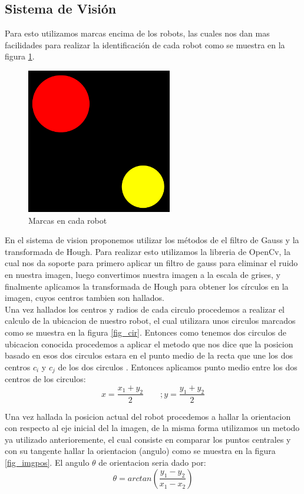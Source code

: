 \documentclass[conference]{IEEEtran}
\begin{document}
\subsection{Sistema de Visi\'on}
Para esto utilizamos marcas encima de los robots, las cuales nos dan mas facilidades para realizar la identificaci\'on de cada robot como se muestra en la figura \ref{fig_marrob}.
	\begin{figure}
	\centering
	\includegraphics[width=2.5in]{imagen1.pdf}
	
	\caption{Marcas en cada robot}
	\label{fig_marrob}
\end{figure}
En el sistema de vision proponemos utilizar los m\'etodos de el filtro de Gauss y la transformada de Hough. Para realizar esto utilizamos la libreria de OpenCv, la cual nos da soporte para primero aplicar un filtro de gauss para eliminar el ruido en nuestra imagen, luego convertimos nuestra imagen a la escala de grises, y finalmente aplicamos la transformada de Hough para obtener los c\'irculos en la imagen, cuyos centros tambien son hallados.\\
Una vez hallados los centros y radios de cada circulo procedemos a realizar el calculo de la ubicacion de nuestro robot, el cual utilizara unos circulos marcados como se muestra en la figura  \ref{fig_cir}. Entonces como tenemos dos circulos de ubicacion conocida procedemos a aplicar el metodo  que nos dice que la posicion basado en esos dos circulos estara en el punto medio de la recta que une los dos centros  $c_i$ y $c_j$ de los dos circulos \cite{kelson_glo}. Entonces aplicamos punto medio entre los dos centros de los circulos:
\begin{equation}
x=\frac{x_1+y_2}{2} \qquad; y=\frac{y_1+y_2}{{2}}
\end{equation}

Una vez hallada la posicion actual del robot procedemos a hallar la orientacion con respecto al eje inicial del la imagen, de la misma forma utilizamos un metodo ya utilizado anterioremente,  el cual consiste en comparar los puntos centrales y con su tangente hallar la orientacion (angulo)\cite{kelson_glo} como se muestra en la figura \ref{fig_imgpos}. El angulo $\theta$ de orientacion seria dado por:
\begin{equation}
\theta=arctan(\frac{y_1-y_2}{x_1-x_2} )
\end{equation}
\end{document}
